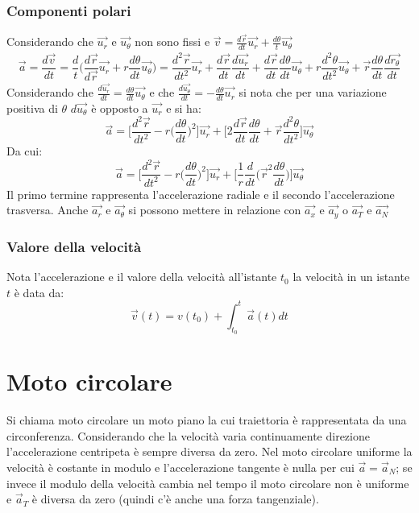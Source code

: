 \documentclass[class=book, crop=false, oneside, 12pt]{standalone}
\begin{document}
		\subsubsection{Componenti polari}
    Considerando che $\overrightarrow{u_r}$ e $\overrightarrow{u_\theta}$ non sono fissi e $\overrightarrow{v}=\frac{d\overrightarrow{r}}{dt}\overrightarrow{u_r}+\frac{d\theta}{t}\overrightarrow{u_\theta}$
		\begin{align*}
      \overrightarrow{a}=\dfrac{d\overrightarrow{v}}{dt}=\dfrac{d}{t}\biggl(\dfrac{d\overrightarrow{r}}{d\overrightarrow{r}}\overrightarrow{u_r}+r\dfrac{d\theta}{dt}\overrightarrow{u_\theta}\biggr)=\dfrac{d^2\overrightarrow{r}}{dt^2}\overrightarrow{u_r}+\dfrac{d\overrightarrow{r}}{dt}\dfrac{d\overrightarrow{u_r}}{dt}+\dfrac{d\overrightarrow{r}}{dt}\dfrac{d\theta}{dt}\overrightarrow{u_\theta}+r\dfrac{d^2\theta}{dt^2}\overrightarrow{u_\theta}+\overrightarrow{r}\dfrac{d\theta}{dt}\dfrac{d\overrightarrow{r_\theta}}{dt}
		\end{align*}
    Considerando che $\frac{d\overrightarrow{u_r}}{dt}=\frac{d\theta}{dt}\overrightarrow{u_\theta}$ e che $\frac{d\overrightarrow{u_\theta}}{dt}=-\frac{d\theta}{dt}\overrightarrow{u_r}$ si nota che per una variazione positiva di $\theta$ $d\overrightarrow{u_\theta}$ \`e opposto a $\overrightarrow{u_r}$  e si ha:
    $$\overrightarrow{a}=\biggl[\dfrac{d^2\overrightarrow{r}}{dt^2}-r\biggl(\dfrac{d\theta}{dt}\biggr)^2\biggr]\overrightarrow{u_r}+\biggl[2\dfrac{d\overrightarrow{r}}{dt}\dfrac{d\theta}{dt}+\overrightarrow{r}\dfrac{d^2\theta}{dt^2}\biggr]\overrightarrow{u_\theta}$$
		Da cui:
    $$\overrightarrow{a}=\biggl[\dfrac{d^2\overrightarrow{r}}{dt^2}-r\biggl(\dfrac{d\theta}{dt}\biggr)^2\biggr]\overrightarrow{u_r}+\biggl[\dfrac{1}{r}\dfrac{d}{dt}\biggl(\overrightarrow{r}^2\dfrac{d\theta}{dt}\biggr)\biggr]\overrightarrow{u_\theta}$$
		Il primo termine rappresenta l'accelerazione radiale e il secondo l'accelerazione trasversa.
    Anche $\overrightarrow{a_r}$ e $\overrightarrow{a_\theta}$ si possono mettere in relazione con $\overrightarrow{a_x}$ e $\overrightarrow{a_y}$ o $\overrightarrow{a_T}$ e $\overrightarrow{a_N}$
		\subsubsection{Valore della velocit\`a}
		Nota l'accelerazione e il valore della velocit\`a all'istante $t_0$ la velocit\`a in un istante $t$ \`e data da:
    $$\overrightarrow{v}(t)=v(t_0)+\int_{t_0}^t\overrightarrow{a}(t)dt$$
\section{Moto circolare}
Si chiama moto circolare un moto piano la cui traiettoria è rappresentata da una circonferenza.
Considerando che la velocità varia continuamente direzione l'accelerazione centripeta è sempre diversa da zero.
Nel moto circolare uniforme la velocità è costante in modulo e l'accelerazione tangente è nulla per cui \(\overrightarrow{a} = \overrightarrow{a}_N\);
se invece il modulo della velocità cambia nel tempo il moto circolare non è uniforme e \(\overrightarrow{a}_T\) è diversa da zero (quindi c'è anche una forza tangenziale).
\end{document}
